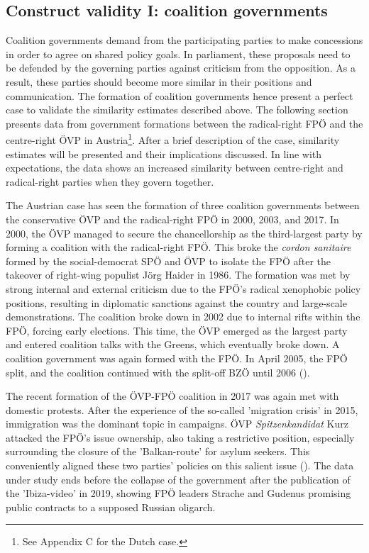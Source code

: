 \documentclass{article}
\begin{document}
\subsection{Construct validity I: coalition governments}
Coalition governments demand from the participating parties to make concessions in order to agree on shared policy goals. In parliament, these proposals need to be defended by the governing parties against criticism from the opposition. As a result, these parties should become more similar in their positions and communication. The formation of coalition governments hence present a perfect case to validate the similarity estimates described above. The following section presents data from government formations between the radical-right FPÖ and the centre-right ÖVP in Austria\footnote{See Appendix C for the Dutch case.}. After a brief description of the case, similarity estimates will be presented and their implications discussed. In line with expectations, the data shows an increased similarity between centre-right and radical-right parties when they govern together. \par


The Austrian case has seen the formation of three coalition governments between the conservative ÖVP and the radical-right FPÖ in 2000, 2003, and 2017. In 2000, the ÖVP managed to secure the chancellorship as the third-largest party by forming a coalition with the radical-right FPÖ. This broke the \textit{cordon sanitaire} formed by the social-democrat SPÖ and ÖVP to isolate the FPÖ after the takeover of right-wing populist Jörg Haider in 1986. The formation was met by strong internal and external criticism due to the FPÖ's radical xenophobic policy positions, resulting in diplomatic sanctions against the country and large-scale demonstrations. The coalition broke down in 2002 due to internal rifts within the FPÖ, forcing early elections. This time, the ÖVP emerged as the largest party and entered coalition talks with the Greens, which eventually broke down. A coalition government was again formed with the FPÖ. In April 2005, the FPÖ split, and the coalition continued with the split-off BZÖ until 2006 (\cite{Luther2010}).\par

The recent formation of the ÖVP-FPÖ coalition in 2017 was again met with domestic protests. After the experience of the so-called 'migration crisis' in 2015, immigration was the dominant topic in campaigns. ÖVP \textit{Spitzenkandidat} Kurz attacked the FPÖ's issue ownership, also taking  a restrictive position, especially surrounding the closure of the 'Balkan-route' for asylum seekers. This conveniently aligned these two parties' policies on this salient issue (\cite{Bodlos2018}). The data under study ends before the collapse of the government after the publication of the 'Ibiza-video' in 2019, showing FPÖ leaders Strache and Gudenus promising public contracts to a supposed Russian oligarch.\par 
\end{document}
